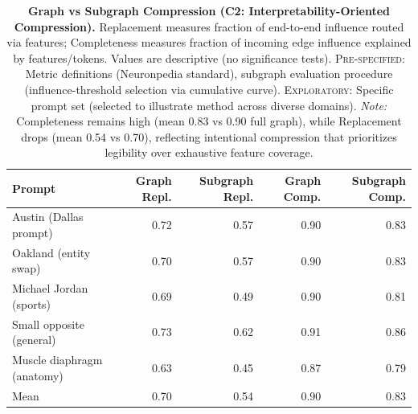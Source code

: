 \begin{table}[H]
\centering
\caption{\textbf{Graph vs Subgraph Compression (C2: Interpretability-Oriented Compression).} Replacement measures fraction of end-to-end influence routed via features; Completeness measures fraction of incoming edge influence explained by features/tokens. Values are descriptive (no significance tests). \textsc{Pre-specified:} Metric definitions (Neuronpedia standard), subgraph evaluation procedure (influence-threshold selection via cumulative curve). \textsc{Exploratory:} Specific prompt set (selected to illustrate method across diverse domains). \emph{Note:} Completeness remains high (mean 0.83 vs 0.90 full graph), while Replacement drops (mean 0.54 vs 0.70), reflecting intentional compression that prioritizes legibility over exhaustive feature coverage.}
\label{tab:graph-subgraph}
\begin{tabular}{lrrrr}
\toprule
\textbf{Prompt} & \textbf{Graph Repl.} & \textbf{Subgraph Repl.} & \textbf{Graph Comp.} & \textbf{Subgraph Comp.} \\
\midrule
Austin (Dallas prompt)      & 0.72 & 0.57 & 0.90 & 0.83 \\
Oakland (entity swap)       & 0.70 & 0.57 & 0.90 & 0.83 \\
Michael Jordan (sports)     & 0.69 & 0.49 & 0.90 & 0.81 \\
Small opposite (general)    & 0.73 & 0.62 & 0.91 & 0.86 \\
Muscle diaphragm (anatomy)  & 0.63 & 0.45 & 0.87 & 0.79 \\
\midrule
Mean                        & 0.70 & 0.54 & 0.90 & 0.83 \\
\bottomrule
\end{tabular}
\end{table}


